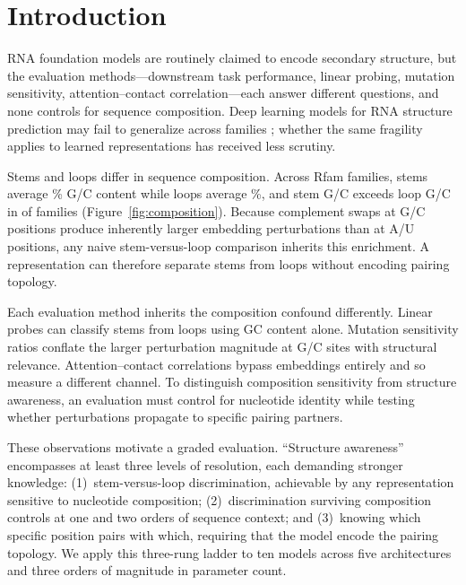 \documentclass[11pt]{article}
\begin{document}
\section{Introduction}
\label{sec:intro}

RNA foundation models are routinely claimed to encode secondary structure,
but the evaluation methods---downstream task performance, linear probing,
mutation sensitivity, attention--contact correlation---each answer different
questions, and none controls for sequence composition. Deep learning models
for RNA structure prediction may fail to generalize across families
\citep{szikszai2022generalization}; whether the same fragility applies to
learned representations has received less scrutiny.

Stems and loops differ in sequence composition. Across \panelN{} Rfam families,
stems average \panelStemGC{}\% G/C content while loops average
\panelLoopGC{}\%, and stem G/C exceeds loop G/C in \panelGCEnriched{} of
\panelGCScored{} families (Figure~\ref{fig:composition}). Because complement swaps at G/C positions
produce inherently larger embedding perturbations than at A/U positions,
any naive stem-versus-loop comparison inherits this enrichment. A
representation can therefore separate stems from loops without encoding
pairing topology.

Each evaluation method inherits the composition confound differently.
Linear probes can classify stems from loops using GC content alone.
Mutation sensitivity ratios conflate the larger perturbation magnitude at
G/C sites with structural relevance. Attention--contact correlations
bypass embeddings entirely and so measure a different channel. To
distinguish composition sensitivity from structure awareness, an
evaluation must control for nucleotide identity while testing whether
perturbations propagate to specific pairing partners.

These observations motivate a graded evaluation.
``Structure awareness'' encompasses at least three levels of
resolution, each demanding stronger knowledge: (1)~stem-versus-loop
discrimination, achievable by any representation sensitive to
nucleotide composition; (2)~discrimination surviving composition
controls at one and two orders of sequence context; and (3)~knowing
which specific position pairs with which, requiring that the model
encode the pairing topology. We apply this three-rung ladder to ten models across five architectures
and three orders of magnitude in parameter count.
\end{document}
